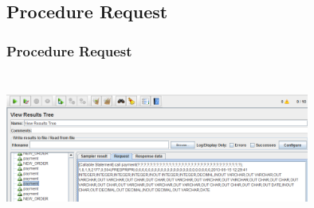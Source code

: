 \documentclass[12pt]{beamer}
\begin{document}
\subsection{Procedure Request}
\begin{frame}[c]
\frametitle{Procedure Request}
\centering
   \includegraphics[width=10cm, height=5cm]{images/request}

\end{frame}


\end{document}
